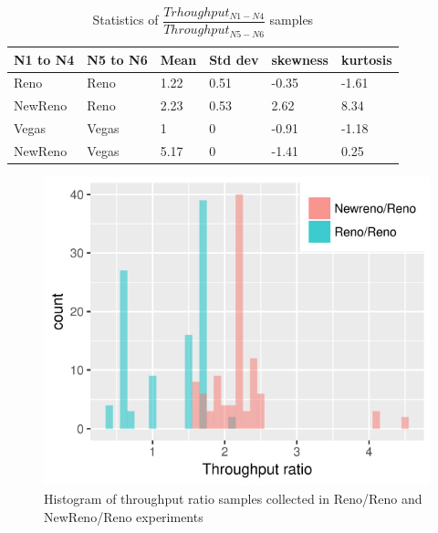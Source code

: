 \documentclass[USenglish,oneside,twocolumn]{article}
\begin{document}
\begin{table}
	\begin{tabular}{| l | l | l | l | l | l |}
		N1 to N4 & N5 to N6 & Mean & Std dev & skewness & kurtosis \\ \hline
		Reno & Reno & 1.22 & 0.51 & -0.35 & -1.61 \\ \hline
		NewReno & Reno & 2.23 & 0.53 & 2.62 & 8.34 \\ \hline
		Vegas & Vegas & 1 & 0 & -0.91 & -1.18 \\ \hline
		NewReno & Vegas & 5.17 & 0 & -1.41 & 0.25 \\ 
	\end{tabular}
	\captionsetup{justification=centering}
	\caption{Statistics of \(\dfrac{Trhoughput_{N1-N4}}{Throughput_{N5-N6}}\) samples}
	\label{Throughput statistics}
\end{table}

\begin{figure}
	\centering
	\includegraphics[width=\linewidth]{fig/experiment2/throughput_ratio.pdf}
	\captionsetup{justification=centering}
	\caption{Histogram of throughput ratio samples collected in Reno/Reno and NewReno/Reno experiments}
	\label{ratio histogram}
\end{figure}
\end{document}
